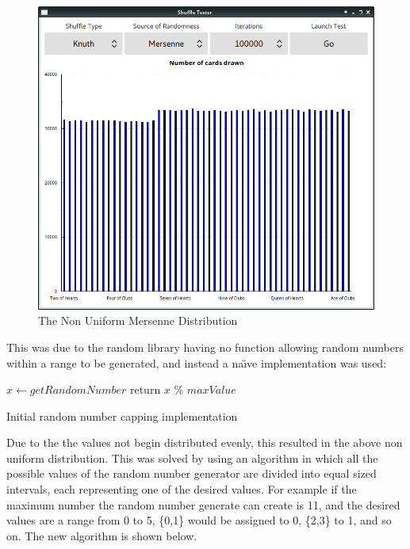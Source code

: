 \begin{figure}[H]
    \centering
    \includegraphics[width=0.8\linewidth]{../images/faultymersenne.png}
    \caption{The Non Uniform Mersenne Distribution}%
    \label{fig:faultymersenne}
\end{figure}

This was due to the random library having no function allowing random numbers
within a range to be generated, and instead a na\"{\i}ve implementation was
used:

\vspace{0.3cm}

\begin{algorithm}[H]
    \BlankLine{}
    $x \leftarrow getRandomNumber$\;
    return $x$ \% $maxValue$\;
\caption{Initial random number capping implementation}%
\label{code:rngBadCapping}
\end{algorithm}

\vspace{0.3cm}

Due to the the values not begin distributed evenly, this resulted in the
above non uniform distribution. This was solved by using an algorithm in which
all the possible values of the random number generator are divided into equal
sized intervals, each representing one of the desired values. For example
if the maximum number the random number generate can create is 11, and the
desired values are a range from 0 to 5, \{0,1\} would be assigned to 0, \{2,3\}
to 1, and so on. The new algorithm is shown below. \parencite{website:reich2011}

